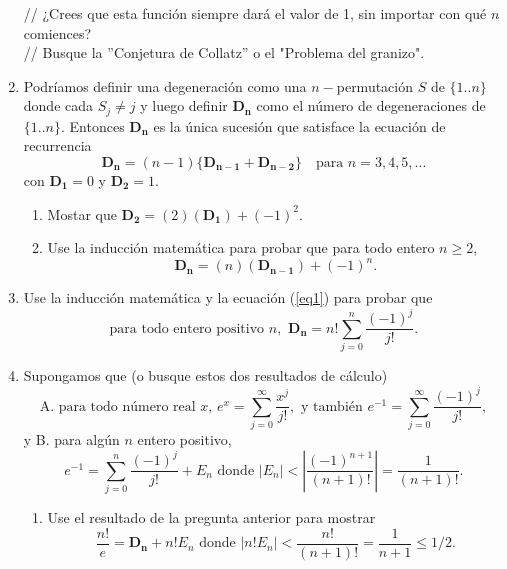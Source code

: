 \documentclass[12pt, a4paper]{book}
\begin{document}
\begin{enumerate}
// ¿Crees que esta función siempre dará el valor de 1, sin importar con qué $n$ comiences?\\// Busque la ''Conjetura de Collatz'' o el "Problema del granizo".
    \item Podríamos definir una degeneración como una $n-$permutación $S$ de $\{1..n\}$ donde cada $S_j\neq j$ y luego definir $\mathbf{D_n}$ como el número de degeneraciones de $\{1..n\}$. Entonces $\mathbf{D_n}$ es la única sucesión  que satisface la ecuación de recurrencia \begin{equation}\label{eq1}
    \mathbf{D_n} =(n-1)\{\mathbf{D_{n-1}}+\mathbf{D_{n-2}}\}\quad\text{para }n=3,4,5,...    
    \end{equation} con $\mathbf{D_1}=0$ y $\mathbf{D_2}=1$.
    \begin{enumerate}
        \item Mostar que $\mathbf{D_2}=(2)(\mathbf{D_1})+(-1)^2$.
        \item Use la inducción matemática para probar que para todo entero $n\geq 2$, $$\mathbf{D_n}=(n)(\mathbf{D_{n-1}})+(-1)^n.$$
    \end{enumerate}
    \item Use la inducción matemática y la ecuación (\ref{eq1}) para probar que $$\text{para todo entero positivo }n,\,\, \mathbf{D_n}=n!\sum_{j=0}^n\frac{(-1)^j}{j!}.$$
    \item Supongamos que (o busque estos dos resultados de cálculo) $$\text{A. para todo número real }x,\,e^x=\sum_{j=0}^\infty\frac{x^j}{j!},\text{ y también }e^{-1}=\sum_{j=0}^\infty\frac{(-1)^j}{j!},$$ y B. para algún $n$ entero positivo, $$e^{-1}=\sum_{j=0}^n\frac{(-1)^j}{j!}+E_n \text{  donde }|E_n|<\left|\frac{(-1)^{n+1}}{(n+1)!}\right|=\frac{1}{(n+1)!}.$$
    \begin{enumerate}
        \item Use el resultado de la pregunta anterior para mostrar $$\frac{n!}{e}=\mathbf{D_n}+n!E_n\text{  donde }|n!E_n|<\frac{n!}{(n+1)!}=\frac{1}{n+1}\leq 1/2.$$
        

\end{enumerate}
\end{enumerate}
\end{document}
